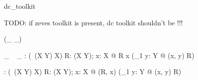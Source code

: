 
\begin{zsection}
   \SECTION dc\_toolkit
\end{zsection}

TODO: if zeves toolkit is present, dc toolkit shouldn't be !!!

\begin{zed}
   \relation (\_ \appliesTo \_)
\end{zed}

\begin{gendef}[X, Y]
   \_ \appliesTo~ \_ : \power(\power~(X \cross Y) \cross X)
\where
   \forall R: \power(X \cross Y); x: X @ R \appliesTo x \iff (\exists_1 y: Y @ (x, y) \in R)
\end{gendef} 

\begin{gendef}[X, Y]
   \appliesToNofix : \power(\power~(X \cross Y) \cross X)
\where
   \forall R: \power(X \cross Y); x: X @ (R, x) \in \appliesToNofix \iff (\exists_1 y: Y @ (x, y) \in R)
\end{gendef} 
